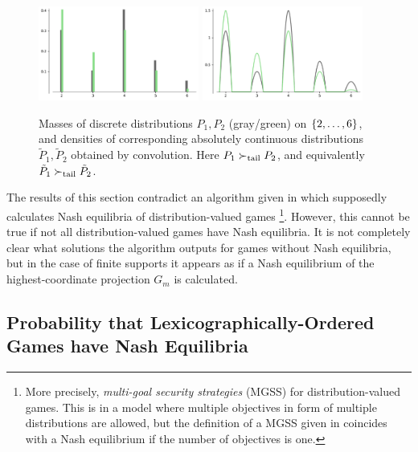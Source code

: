 \documentclass[a4paper,DIV=11,abstracton,twoside=semi]{scrreprt}
\theoremstyle{definition}
\begin{document}
    \begin{figure}
        \centering
        \includegraphics[width=0.47\textwidth]{Pictures/leqtail-rlex-masses-plot}
        \raisebox{60pt}{\Large$\shortrightarrow$}
        \includegraphics[width=0.47\textwidth]{Pictures/leqtail-rlex-densities-plot}
        \caption{Masses of discrete distributions $P_{1}, P_{2}$ (gray/green) on $\{2, \dots, 6\}$, and densities of corresponding absolutely continuous distributions $\tilde{P}_{1}, \tilde{P}_{2}$ obtained by convolution. Here $P_{1} \succ_{\text{tail}} P_2$, and equivalently $\tilde{P}_1 \succ_{\text{tail}} \tilde{P}_2$.}
        \label{fig:discrete-ac-convolution-example}
    \end{figure}
    
    The results of this section contradict an algorithm given in \cite[Section 3.1]{bib:rassGameRiskManagII} which supposedly calculates Nash equilibria of distribution-valued games
    \footnote{More precisely, \emph{multi-goal security strategies} (MGSS) for distribution-valued games. This is in a model where multiple objectives in form of multiple distributions are allowed, but the definition of a MGSS given in \cite[Definition 4.1]{bib:rassGameRiskManagI} coincides with a Nash equilibrium if the number of objectives is one.}.
    However, this cannot be true if not all distribution-valued games have Nash equilibria.
    It is not completely clear what solutions the algorithm outputs for games without Nash equilibria, but in the case of finite supports it appears as if a Nash equilibrium of the highest-coordinate projection $G_m$ is calculated.

    
    \subsection{Probability that Lexicographically-Ordered Games have Nash Equilibria}
    
\end{document}
